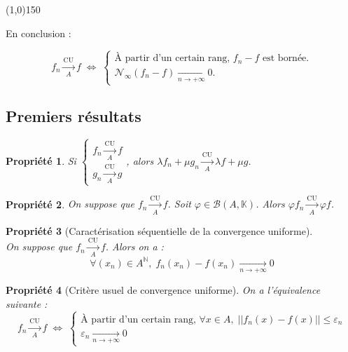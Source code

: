 \documentclass[12pt]{book}
\let\ensembleNombre\mathbb
\newcommand*\N{\ensuremath{\ensembleNombre{N}}}
\newcommand*\K{\ensuremath{\ensembleNombre{K}}}
\newcommand*\B{\ensuremath{\mathcal B}}
\newcommand{\limite}[2]{\ensuremath{\underset{#1 \to #2}{\longrightarrow}}}
\newcommand{\lu}[1]{\ensuremath{\overset{\mathrm{CU}}{\underset{#1}{\longrightarrow}}}}
\newcommand{\hr}{\begin{center}
					\line(1,0){150}
 				 \end{center}}
\newtheorem*{prop}{Propriété}
\theoremstyle{definition}
\theoremstyle{remark}
\begin{document}
\hr
	
	En conclusion :
	
	\[ \boxed{ f_n \lu{A} f \;\Longleftrightarrow\; \begin{cases}
											\text{À partir d'un certain rang, } f_n - f \text{ est bornée.} \\
											\mathcal N_\infty(f_n - f) \limite{n}{+\infty} 0.
											\end{cases}}	\]
	
		\subsection{Premiers résultats}
	\begin{prop}
	Si $\begin{cases}
		  f_n \lu A f \\
		  g_n \lu A g
		  \end{cases}$, alors $\lambda f_n + \mu g_n \lu A \lambda f + \mu g$.
	\end{prop}
	
	\begin{prop}
	On suppose que $f_n \lu A f$. Soit $\varphi \in \B(A, \K)$. Alors $\varphi f_n \lu A \varphi f$.
	\end{prop}
	
	\begin{prop}[Caractérisation séquentielle de la convergence uniforme]\mbox{~}\\
	On suppose que $f_n \lu A f$. Alors on a :
	\[ \forall (x_n) \in A^\N,\; f_n(x_n) - f(x_n) \limite{n}{+\infty} 0 \]
	\end{prop}
	
	\begin{prop}[Critère usuel de convergence uniforme]
	On a l'équivalence suivante :
	\[\boxed{f_n \lu A f \;\Longleftrightarrow\; \begin{cases}
		\text{À partir d'un certain rang, } \forall x \in A,\; ||f_n(x) - f(x) || \leq \varepsilon_n \\
		\varepsilon_n \limite{n}{+\infty} 0
		\end{cases}}\]
	\end{prop}
	
\end{document}
